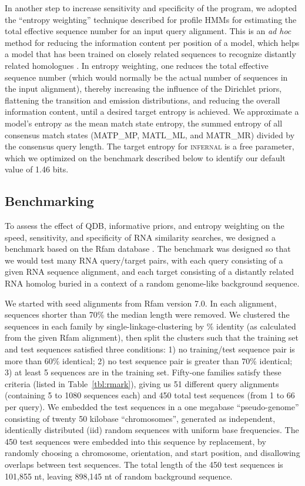 \documentclass[11pt]{article}
\begin{document}
In another step to increase sensitivity and specificity of the
program, we adopted the ``entropy weighting'' technique described for
profile HMMs \cite{Karplus98} for estimating the total effective
sequence number for an input query alignment. This is an \emph{ad hoc}
method for reducing the information content per position of a model,
which helps a model that has been trained on closely related sequences
to recognize distantly related homologues \cite{Altschul91}. In
entropy weighting, one reduces the total effective sequence number
(which would normally be the actual number of sequences in the input
alignment), thereby increasing the influence of the Dirichlet priors,
flattening the transition and emission distributions, and reducing the
overall information content, until a desired target entropy is
achieved. We approximate a model's entropy as the mean match state
entropy, the summed entropy of all consensus match states (MATP\_MP,
MATL\_ML, and MATR\_MR) divided by the consensus query length.  The
target entropy for \textsc{infernal} is a free parameter, which we
optimized on the benchmark described below to identify our default
value of 1.46 bits.

\subsection{Benchmarking}

To assess the effect of QDB, informative priors, and entropy weighting
on the speed, sensitivity, and specificity of RNA similarity searches,
we designed a benchmark based on the Rfam database
\cite{Griffiths-Jones05}. The benchmark was designed so that we would
test many RNA query/target pairs, with each query consisting of a
given RNA sequence alignment, and each target consisting of a
distantly related RNA homolog buried in a context of a random
genome-like background sequence.

We started with seed alignments from Rfam version 7.0. In each
alignment, sequences shorter than 70\% the median length were removed.
We clustered the sequences in each family by single-linkage-clustering
by \% identity (as calculated from the given Rfam alignment), then
split the clusters such that the training set and test sequences
satisfied three conditions: 1) no training/test sequence pair is more
than 60\% identical; 2) no test sequence pair is greater than 70\%
identical; 3) at least 5 sequences are in the training set.  Fifty-one
families satisfy these criteria (listed in Table~\ref{tbl:rmark}),
giving us 51 different query alignments (containing 5 to 1080
sequences each) and 450 total test sequences (from 1 to 66 per query).
We embedded the test sequences in a one megabase ``pseudo-genome''
consisting of twenty 50 kilobase ``chromosomes'', generated as
independent, identically distributed (iid) random sequences with
uniform base frequencies.  The 450 test sequences were embedded into
this sequence by replacement, by randomly choosing a chromosome,
orientation, and start position, and disallowing overlaps between test
sequences. The total length of the 450 test sequences is 101,855 nt,
leaving 898,145 nt of random background sequence.
\end{document}
